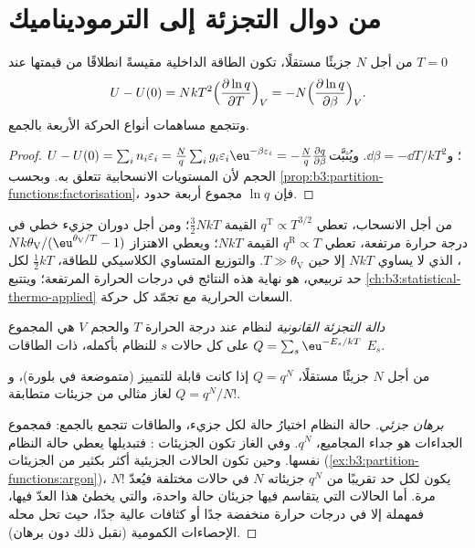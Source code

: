 \section{من دوال التجزئة إلى الترموديناميك}

\begin{theorem}\label{thm:b3:partition-functions:internal-energy}
من أجل $N$ جزيئًا مستقلًا، تكون الطاقة الداخلية مقيسةً انطلاقًا من قيمتها عند
$T = 0$
\[
  U - U(0) = NkT^2\Bigl(\frac{\partial\ln q}{\partial T}\Bigr)_V
          = -N\Bigl(\frac{\partial\ln q}{\partial\beta}\Bigr)_V .
\]
وتتجمع مساهمات أنواع الحركة الأربعة بالجمع.
\end{theorem}

\begin{proof}
$U - U(0) = \sum_in_i\varepsilon_i = \frac Nq\sum_ig_i\varepsilon_i\eu^{-\beta\varepsilon_i} = -\frac Nq\frac{\partial q}{\partial\beta}$؛
و$\dd\beta = -\dd T/kT^2$. ويُثبَّت الحجم لأن المستويات الانسحابية
تتعلق به. وبحسب \cref{prop:b3:partition-functions:factorisation}، فإن $\ln q$
مجموع أربعة حدود.
\end{proof}

من أجل الانسحاب، تعطي $q^{\mathrm T} \propto T^{3/2}$ القيمة $\frac32NkT$؛ ومن أجل دوران جزيء خطي
في درجة حرارة مرتفعة، تعطي $q^{\mathrm R} \propto T$ القيمة $NkT$؛ ويعطي الاهتزاز
$Nk\theta_{\mathrm V}/(\eu^{\theta_{\mathrm V}/T} - 1)$، الذي لا يساوي $NkT$ إلا حين $T \gg \theta_{\mathrm V}$. 
والتوزيع المتساوي الكلاسيكي للطاقة، $\frac12kT$ لكل حد تربيعي، هو
نهاية هذه النتائج في درجات الحرارة المرتفعة؛ ويتتبع \cref{ch:b3:statistical-thermo-applied}
السعات الحرارية مع تجمّد كل حركة.

\begin{definition}\label{def:b3:partition-functions:canonical}
\emph{دالة التجزئة القانونية} لنظام
عند درجة الحرارة $T$ والحجم $V$ هي المجموع $Q = \sum_s\eu^{-E_s/kT}$ على كل
حالات $s$ للنظام بأكمله، ذات الطاقات $E_s$.
\end{definition}

\begin{proposition}\label{prop:b3:partition-functions:canonical}
من أجل $N$ جزيئًا مستقلًا، $Q = q^N$ إذا كانت قابلة للتمييز (متموضعة في
بلورة)، و$Q = q^N/N!$ لغاز مثالي من جزيئات متطابقة.
\end{proposition}

\begin{proof}[برهان جزئي]
حالة النظام اختيارُ حالة لكل جزيء، والطاقات
تتجمع بالجمع: فمجموع الجداءات هو جداء المجاميع، $q^N$. وفي الغاز تكون
الجزيئات : فتبديلها يعطي حالة النظام
نفسها. وحين تكون الحالات الجزيئية أكثر بكثير من الجزيئات
(\cref{ex:b3:partition-functions:argon})، يكون لكل حد تقريبًا من $q^N$ جزيئاته $N$
في حالات مختلفة فيُعدّ $N!$ مرة. أما الحالات التي يتقاسم فيها جزيئان
حالة واحدة، والتي يخطئ هذا العدّ فيها، فمهملة إلا
في درجات حرارة منخفضة جدًا أو كثافات عالية جدًا، حيث تحل محله الإحصاءات الكمومية
(نقبل ذلك دون برهان).
\end{proof}

